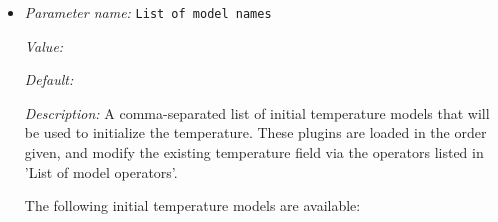\begin{itemize}
\item {\it Parameter name:} {\tt List of model names}
\label{parameters:Initial temperature model/List of model names}


{\it Value:} 


{\it Default:} 


{\it Description:} A comma-separated list of initial temperature models that will be used to initialize the temperature. These plugins are loaded in the order given, and modify the existing temperature field via the operators listed in 'List of model operators'.

The following initial temperature models are available:


\end{itemize}
